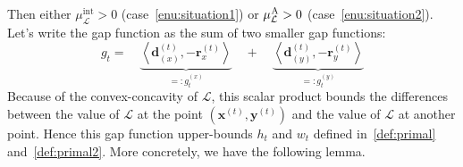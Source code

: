 \documentclass[twoside]{article}
\renewcommand{\L}{\mathcal{L}}
\newcommand{\prodscal}[2]{\left\langle#1,#2\right\rangle}
\newcommand{\xt}{\bm{x}^{(t)}}
\newcommand{\dt}{\bm{d}^{(t)}}
\newcommand{\rt}{\r^{(t)}}
\newcommand{\yt}{\bm{y}^{(t)}}
\newcommand{\gap}{g_{t}}
\newcommand{\away}{{\hspace{0.05em}\textnormal{A}}}
\renewcommand{\r}{\bm{r}}
\newcommand{\muIntL}{\mu^{\text{int}}_\L} %
\newcommand{\0}{\mathbf{0}} %
\begin{document}
  Then either $\muIntL>0$ (case~\ref{enu:situation1}) or $\mu^{\away}_\L>0$ (case~\ref{enu:situation2}).
  Let's write the gap function as the sum of two smaller gap functions:
    \begin{equation} \label{eq:gtGeneralized}
      \gap 
      = \quad \underbrace{\prodscal{ \dt_{(x)}}{-\rt_x}}_{=:\gap^{(x)}} \quad
      + \quad
    \underbrace{\prodscal{ \dt_{(y)}}{ -\rt_y}}_{=:\gap^{(y)}} 
    \end{equation}
  Because of the convex-concavity of $\L$, this scalar product bounds
  the differences between the value of $\L$ at the point
  $(\xt,\yt)$ and the value of $\L$ at another point. Hence this
  gap function upper-bounds $h_t$ and $w_t$ defined in~\eqref{def:primal} and~\eqref{def:primal2}. More concretely, we
  have the following lemma.
\end{document}
